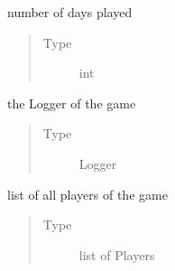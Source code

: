 \documentclass[letterpaper,10pt,english]{sphinxmanual}
\begin{document}
\begin{fulllineitems}
\begin{fulllineitems}
\end{fulllineitems}


\begin{fulllineitems}
\label{\detokenize{chatwolf:chatwolf.game.Game.nd}}
number of days played
\begin{quote}\begin{description}
\item[{Type}] \leavevmode
int

\end{description}\end{quote}

\end{fulllineitems}


\begin{fulllineitems}
\label{\detokenize{chatwolf:chatwolf.game.Game.log}}
the Logger of the game
\begin{quote}\begin{description}
\item[{Type}] \leavevmode
Logger

\end{description}\end{quote}

\end{fulllineitems}


\begin{fulllineitems}
\label{\detokenize{chatwolf:chatwolf.game.Game.players}}
list of all players of the game
\begin{quote}\begin{description}
\item[{Type}] \leavevmode
list of Players

\end{description}\end{quote}

\end{fulllineitems}



\end{fulllineitems}
\end{document}
